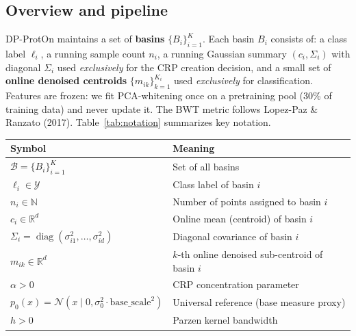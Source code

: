 \documentclass[11pt,a4paper]{article}
\begin{document}
\subsection{Overview and pipeline}

DP-ProtOn maintains a set of \textbf{basins} $\{B_i\}_{i=1}^{K}$. Each basin $B_i$ consists of: a class label $\ell_i$, a running sample count $n_i$, a running Gaussian summary $(c_i,\Sigma_i)$ with diagonal $\Sigma_i$ used \textit{exclusively} for the CRP creation decision, and a small set of \textbf{online denoised centroids} $\{m_{ik}\}_{k=1}^{K_i}$ used \textit{exclusively} for classification. Features are frozen: we fit PCA-whitening once on a pretraining pool (30\% of training data) and never update it. The BWT metric follows Lopez-Paz \& Ranzato (2017). Table~\ref{tab:notation} summarizes key notation.

\medskip\noindent
{\small
\begin{tabular}{@{}ll@{}}
\toprule
Symbol & Meaning \\
\midrule
$\mathcal{B}=\{B_i\}_{i=1}^K$ & Set of all basins \\
$\ell_i\in\mathcal{Y}$ & Class label of basin $i$ \\
$n_i\in\mathbb{N}$ & Number of points assigned to basin $i$ \\
$c_i\in\mathbb{R}^d$ & Online mean (centroid) of basin $i$ \\
$\Sigma_i=\operatorname{diag}(\sigma_{i1}^2,\ldots,\sigma_{id}^2)$ & Diagonal covariance of basin $i$ \\
$m_{ik}\in\mathbb{R}^d$ & $k$-th online denoised sub-centroid of basin $i$ \\
$\alpha>0$ & CRP concentration parameter \\
$p_0(x)=\mathcal{N}(x\mid 0,\sigma_0^2\cdot\text{base\_scale}^2)$ & Universal reference (base measure proxy) \\
$h>0$ & Parzen kernel bandwidth \\
\bottomrule
\end{tabular}
\label{tab:notation}}
\end{document}
